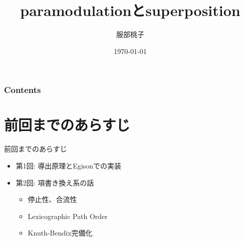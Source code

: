 \documentclass[dvipdfmx,11pt,notheorems]{beamer}
\title[]{paramodulationとsuperposition}%
\author[]{服部桃子}%
\institute[]{}%
\date{\today}%
\theoremstyle{definition}
\begin{document}
\begin{frame}[plain]\frametitle{}
\titlepage %
\end{frame}

\begin{frame}\frametitle{Contents}
\tableofcontents %
\end{frame}

\section{前回までのあらすじ}
\begin{frame}{前回までのあらすじ}
  \begin{itemize}
    \item 第1回: 導出原理とEgisonでの実装
    \item 第2回: 項書き換え系の話
    \begin{itemize}
      \item 停止性、合流性
      \item Lexicographic Path Order
      \item Knuth-Bendix完備化
    \end{itemize}
  \end{itemize}
\end{frame}
\end{document}
